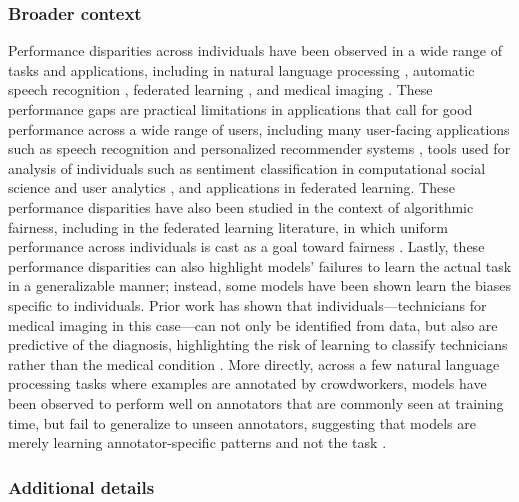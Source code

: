 \subsubsection{Broader context}
Performance disparities across individuals have been observed in a wide range of tasks and applications, including in natural language processing \citep{geva2019annotator},
automatic speech recognition \citep{koenecke2020racial,tatman2017}, federated learning \citep{li2019fair,caldas2018leaf}, and medical imaging \citep{badgeley2019deep}.
These performance gaps are practical limitations in applications that call for good performance across a wide range of users,
including many user-facing applications such as speech recognition \citep{koenecke2020racial,tatman2017} and personalized recommender systems \citep{patro2020fairrec},
tools used for analysis of individuals such as sentiment classification in computational social science \citep{west2014exploiting} and user analytics \citep{lau2014social},
and applications in federated learning.
These performance disparities have also been studied in the context of algorithmic fairness,
including in the federated learning literature,
in which uniform performance across individuals is cast as a goal toward fairness \citep{li2019fair,dwork2012}.
Lastly, these performance disparities can also highlight models' failures to learn the actual task in a generalizable manner;
instead, some models have been shown learn the biases specific to individuals.
Prior work has shown that individuals---technicians for medical imaging in this case---can not only be identified from data, but also are predictive of the diagnosis, highlighting the risk of learning to classify technicians rather than the medical condition \citep{badgeley2019deep}.
More directly,
across a few natural language processing tasks where examples are annotated by crowdworkers, models have been observed to perform well on annotators that are commonly seen at training time, but fail to generalize to unseen annotators,
suggesting that models are merely learning annotator-specific patterns and not the task \citep{geva2019annotator}.

\subsubsection{Additional details}\label{sec:app_amazon_details}

